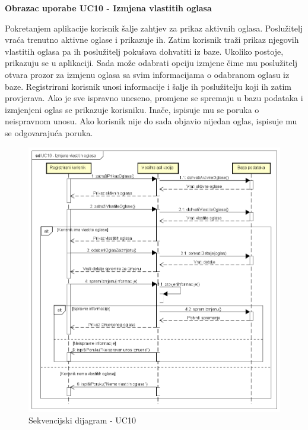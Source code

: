 				\textbf{Obrazac uporabe UC10 - Izmjena vlastitih oglasa}

				Pokretanjem aplikacije korisnik šalje zahtjev za prikaz aktivnih oglasa. Poslužitelj vraća trenutno aktivne oglase i prikazuje ih. Zatim korisnik traži prikaz njegovih vlastitih oglasa pa ih poslužitelj pokušava dohvatiti iz baze. Ukoliko postoje, prikazuju se u aplikaciji. Sada može odabrati opciju izmjene čime mu poslužitelj otvara prozor za izmjenu oglasa sa svim informacijama o odabranom oglasu iz baze. Registrirani korisnik unosi informacije i šalje ih poslužitelju koji ih zatim provjerava. Ako je sve ispravno uneseno, promjene se spremaju u bazu podataka i izmjenjeni oglas se prikazuje korisniku. Inače, ispisuje mu se poruka o neispravnom unosu. Ako korisnik nije do sada objavio nijedan oglas, ispisuje mu se odgovarajuća poruka.

					\begin{figure}[H]
						\includegraphics[scale=0.65]{dijagrami/sekvencijskiDijagrami/sd10} %
						\centering
						\caption{Sekvencijski dijagram - UC10}
						\label{fig:sDijagram10}
					\end{figure}
				
				\eject
	
